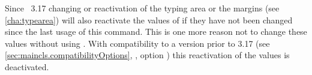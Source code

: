 Since \KOMAScript~3.17 changing or
reactivation of the typing area or the margins (see
\autoref{cha:typearea}) will also reactivate the values of 
if they have not been changed since the last usage of this command. This is
one more reason not to change these values without using \KOMAScript. With
compatibility to a \KOMAScript{} version prior to 3.17 (see
\autoref{sec:maincls.compatibilityOptions},
, option
)
this reactivation of the  values is deactivated.%
%
%




